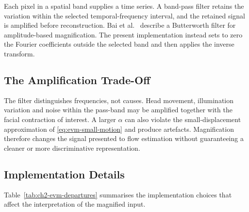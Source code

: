 Each pixel in a spatial band supplies a time series. A band-pass filter retains the variation within the selected temporal-frequency interval, and the retained signal is amplified before reconstruction. Bai et al.~\cite{bai2021} describe a Butterworth filter for amplitude-based magnification. The present implementation instead sets to zero the Fourier coefficients outside the selected band and then applies the inverse transform.

\subsection{The Amplification Trade-Off}
\label{sec:amplification-tradeoff}

The filter distinguishes frequencies, not causes. Head movement, illumination variation and noise within the pass-band may be amplified together with the facial contraction of interest. A larger $\alpha$ can also violate the small-displacement approximation of \eqref{eq:evm-small-motion} and produce artefacts. Magnification therefore changes the signal presented to flow estimation without guaranteeing a cleaner or more discriminative representation.

\subsection{Implementation Details}
\label{sec:evm-departures}

Table~\ref{tab:ch2-evm-departures} summarises the implementation choices that affect the interpretation of the magnified input.

